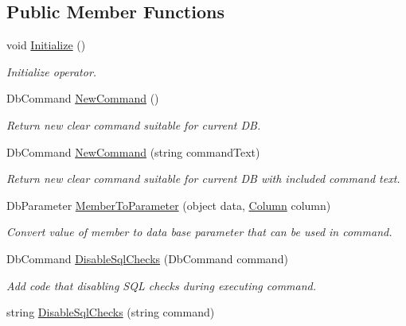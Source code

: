 \subsection*{Public Member Functions}
\begin{DoxyCompactItemize}
\item 
void \mbox{\hyperlink{interface_uniform_data_operator_1_1_sql_1_1_i_sql_operator_a590fa080f8c35ebf5ee6ac535545e2a8}{Initialize}} ()
\begin{DoxyCompactList}\small\item\em Initialize operator. \end{DoxyCompactList}\item 
Db\+Command \mbox{\hyperlink{interface_uniform_data_operator_1_1_sql_1_1_i_sql_operator_afc0fd8b8c82515c498a6959453f331f1}{New\+Command}} ()
\begin{DoxyCompactList}\small\item\em Return new clear command suitable for current DB. \end{DoxyCompactList}\item 
Db\+Command \mbox{\hyperlink{interface_uniform_data_operator_1_1_sql_1_1_i_sql_operator_a10c43a3bfb6e8c88b692488c3341f297}{New\+Command}} (string command\+Text)
\begin{DoxyCompactList}\small\item\em Return new clear command suitable for current DB with included command text. \end{DoxyCompactList}\item 
Db\+Parameter \mbox{\hyperlink{interface_uniform_data_operator_1_1_sql_1_1_i_sql_operator_aa122fe55f022891be5a888ff49e6eddd}{Member\+To\+Parameter}} (object data, \mbox{\hyperlink{class_uniform_data_operator_1_1_sql_1_1_attributes_1_1_column}{Column}} column)
\begin{DoxyCompactList}\small\item\em Convert value of member to data base parameter that can be used in command. \end{DoxyCompactList}\item 
Db\+Command \mbox{\hyperlink{interface_uniform_data_operator_1_1_sql_1_1_i_sql_operator_a12d464e0532a3e194b1221eee0c32d34}{Disable\+Sql\+Checks}} (Db\+Command command)
\begin{DoxyCompactList}\small\item\em Add code that disabling S\+QL checks during executing command. \end{DoxyCompactList}\item 
string \mbox{\hyperlink{interface_uniform_data_operator_1_1_sql_1_1_i_sql_operator_a0757f304a24ffaa743e23e8bdd210950}{Disable\+Sql\+Checks}} (string command)

\end{DoxyCompactItemize}
